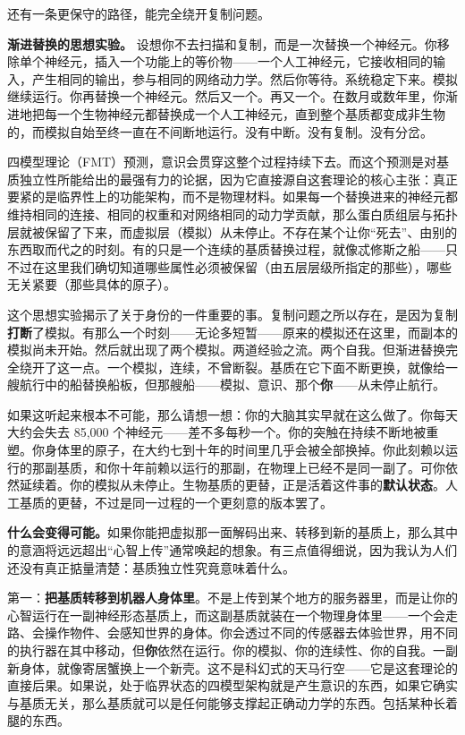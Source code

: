 \documentclass[11pt, twoside, openright]{book}
\begin{document}
还有一条更保守的路径，能完全绕开复制问题。

\textbf{渐进替换的思想实验。} 设想你不去扫描和复制，而是一次替换一个神经元。你移除单个神经元，插入一个功能上的等价物------一个人工神经元，它接收相同的输入，产生相同的输出，参与相同的网络动力学。然后你等待。系统稳定下来。模拟继续运行。你再替换一个神经元。然后又一个。再又一个。在数月或数年里，你渐进地把每一个生物神经元都替换成一个人工神经元，直到整个基质都变成非生物的，而模拟自始至终一直在不间断地运行。没有中断。没有复制。没有分岔。

四模型理论（FMT）预测，意识会贯穿这整个过程持续下去。而这个预测是对基质独立性所能给出的最强有力的论据，因为它直接源自这套理论的核心主张：真正要紧的是临界性上的功能架构，而不是物理材料。如果每一个替换进来的神经元都维持相同的连接、相同的权重和对网络相同的动力学贡献，那么蛋白质组层与拓扑层就被保留了下来，而虚拟层（模拟）从未停止。不存在某个让你“死去”、由别的东西取而代之的时刻。有的只是一个连续的基质替换过程，就像忒修斯之船------只不过在这里我们确切知道哪些属性必须被保留（由五层层级所指定的那些），哪些无关紧要（那些具体的原子）。

这个思想实验揭示了关于身份的一件重要的事。复制问题之所以存在，是因为复制\textbf{打断}了模拟。有那么一个时刻------无论多短暂------原来的模拟还在这里，而副本的模拟尚未开始。然后就出现了两个模拟。两道经验之流。两个自我。但渐进替换完全绕开了这一点。一个模拟，连续，不曾断裂。基质在它下面不断更换，就像给一艘航行中的船替换船板，但那艘船------模拟、意识、那个\textbf{你}------从未停止航行。

如果这听起来根本不可能，那么请想一想：你的大脑其实早就在这么做了。你每天大约会失去 85,000 个神经元------差不多每秒一个。你的突触在持续不断地被重塑。你身体里的原子，在大约七到十年的时间里几乎会被全部换掉。你此刻赖以运行的那副基质，和你十年前赖以运行的那副，在物理上已经不是同一副了。可你依然延续着。你的模拟从未停止。生物基质的更替，正是活着这件事的\textbf{默认状态}。人工基质的更替，不过是同一过程的一个更刻意的版本罢了。

\textbf{什么会变得可能。}如果你能把虚拟那一面解码出来、转移到新的基质上，那么其中的意涵将远远超出“心智上传”通常唤起的想象。有三点值得细说，因为我认为人们还没有真正掂量清楚：基质独立性究竟意味着什么。

第一：\textbf{把基质转移到机器人身体里}。不是上传到某个地方的服务器里，而是让你的心智运行在一副神经形态基质上，而这副基质就装在一个物理身体里------一个会走路、会操作物件、会感知世界的身体。你会透过不同的传感器去体验世界，用不同的执行器在其中移动，但\textbf{你}依然在运行。你的模拟、你的连续性、你的自我。一副新身体，就像寄居蟹换上一个新壳。这不是科幻式的天马行空------它是这套理论的直接后果。如果说，处于临界状态的四模型架构就是产生意识的东西，如果它确实与基质无关，那么基质就可以是任何能够支撑起正确动力学的东西。包括某种长着腿的东西。
\end{document}
